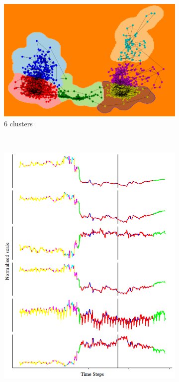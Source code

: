 \documentclass[runningheads]{llncs}
\begin{document}
\begin{figure}[H]
	\begin{subfigure}[b]{0.5\textwidth}
		\includegraphics[width=\textwidth]{pca_cluster_6.png}
		\caption{\(6\) clusters}
		\label{fig:pca_cluster_6}
	\end{subfigure}
	~
	\begin{subfigure}[b]{0.25\textwidth}
		\includegraphics[width=\textwidth]{context_timeline_6.png}
		\label{fig:context_timeline_6}
	\end{subfigure}
	

\end{figure}
\end{document}
